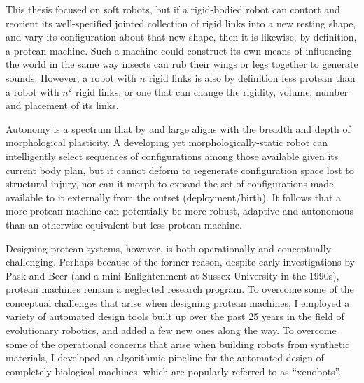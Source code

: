 This thesis focused on soft robots,
but if a rigid-bodied robot can contort and reorient its well-specified jointed collection of rigid links into a new resting shape, and vary its configuration about that new shape, then it is likewise, by definition, a protean machine.
Such a machine could construct its own means of influencing the world in the same way insects can rub their wings or legs together
to generate sounds.
However, a robot with $n$ rigid links is also by definition less protean than a robot with $n^2$ rigid links, or one that can change the rigidity, volume, number and placement of its links.

Autonomy is a spectrum that by and large aligns with the breadth and depth of morphological plasticity.
A developing yet morphologically-static robot \cite{husbands1998better,floreano1996plastic,bongard2011morphological,bongard2006resilient,cully2015robots} can intelligently select sequences of configurations among those available given its current body plan,
but it cannot deform to regenerate configuration space lost to structural injury, nor can it morph to expand the set of configurations made available to it externally from the outset (deployment/birth).
It follows that a more protean machine can potentially be more robust, adaptive and autonomous than an otherwise equivalent but less protean machine.


Designing protean systems, however, is both operationally and conceptually challenging.
Perhaps because of the former reason, despite early investigations by Pask and Beer (and a mini-Enlightenment at Sussex University in the 1990s), protean machines remain a neglected research program.
To overcome some of the conceptual challenges that arise when designing protean machines,
I employed a variety of automated design tools built up over the past 25 years in the field of evolutionary robotics, and added a few new ones along the way.
To overcome some of the operational concerns that arise when building robots from synthetic materials,
I developed an algorithmic pipeline for the 
automated design of completely biological machines,
which are popularly referred to as ``xenobots''.


